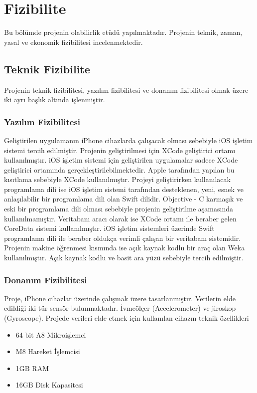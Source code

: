 \chapter{Fizibilite}

Bu bölümde projenin olabilirlik etüdü yapılmaktadır. Projenin teknik, zaman, yasal ve ekonomik fizibilitesi incelenmektedir.

\section{Teknik Fizibilite}
Projenin teknik fizibilitesi, yazılım fizibilitesi ve donanım fizibilitesi olmak üzere iki ayrı başlık altında işlenmiştir.

\subsection{Yazılım Fizibilitesi}
Geliştirilen uygulamanın iPhone cihazlarda çalışacak olması sebebiyle iOS işletim sistemi tercih edilmiştir. Projenin geliştirilmesi için XCode geliştirici ortamı kullanılmıştır. iOS işletim sistemi için geliştirilen uygulamalar sadece XCode geliştirici ortamında gerçekleştirilebilmektedir. Apple tarafından yapılan bu kısıtlama sebebiyle XCode kullanılmıştır. 
Projeyi geliştirirken kullanılacak programlama dili ise iOS işletim sistemi tarafından desteklenen, yeni, esnek ve anlaşılabilir bir programlama dili olan Swift dilidir. Objective - C karmaşık ve eski bir programlama dili olması sebebiyle projenin geliştirilme aşamasında kullanılmamıştır.
Veritabanı aracı olarak ise XCode ortamı ile beraber gelen CoreData sistemi kullanılmıştır. iOS işletim sistemleri üzerinde Swift programlama dili ile beraber oldukça verimli çalışan bir veritabanı sistemidir. Projenin makine öğrenmesi kısmında ise açık kaynak kodlu bir araç olan Weka  kullanılmıştır. Açık kaynak kodlu ve basit ara yüzü sebebiyle tercih edilmiştir.

\subsection{Donanım Fizibilitesi}
Proje, iPhone cihazlar üzerinde çalışmak üzere tasarlanmıştır. Verilerin elde edildiği iki tür sensör bulunmaktadır. İvmeölçer (Accelerometer) ve jiroskop (Gyroscope). Projede verileri elde etmek için kullanılan cihazın teknik özellikleri
\begin{itemize}
  \item 64 bit A8 Mikroişlemci
  \item M8 Hareket İşlemcisi
  \item 1GB RAM
  \item 16GB Disk Kapasitesi
\end{itemize}

